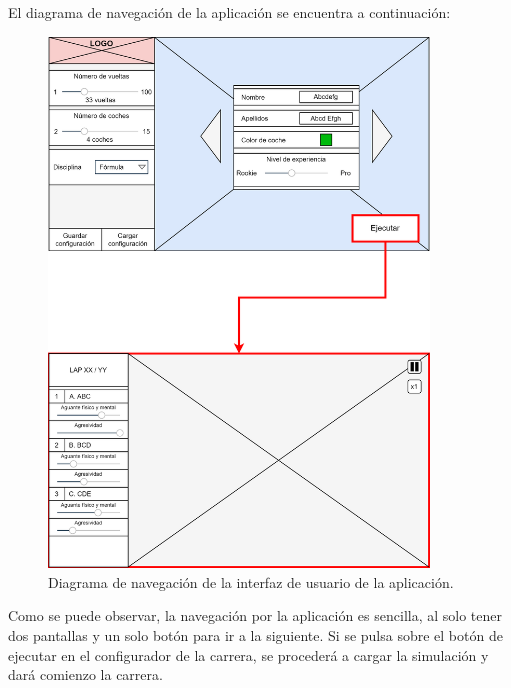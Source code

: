 \bigskip
\newpage
El diagrama de navegación de la aplicación se encuentra a continuación:

\begin{figure}[H]
    \centering
    \includegraphics[width=0.9\textwidth]{imagenes/nav.png}
    \caption{Diagrama de navegación de la interfaz de usuario de la aplicación.}
 \end{figure}

 Como se puede observar, la navegación por la aplicación es sencilla, al solo tener dos pantallas y un solo botón para ir a la siguiente. Si se pulsa sobre el botón de ejecutar en el configurador de la carrera, se procederá a cargar la simulación y dará comienzo la carrera.